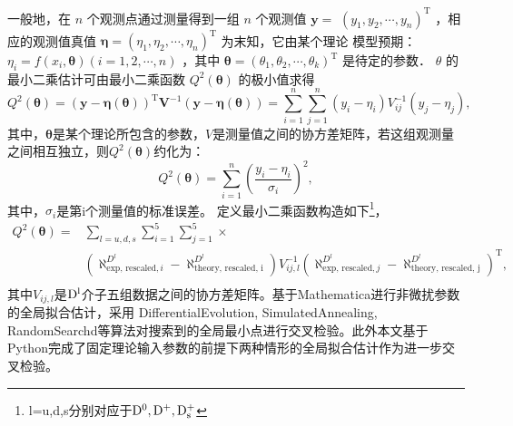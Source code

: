 一般地，在 $n$ 个观测点通过测量得到一组 $n$ 个观测值 $\boldsymbol{y}=$ $\left(y_1, y_2, \cdots, y_n\right)^{\mathrm{T}}$ ，相应的观测值真值 $\boldsymbol{\eta}=\left(\eta_1, \eta_2, \cdots, \eta_n\right)^{\mathrm{T}}$ 为末知，它由某个理论
模型预期：$\eta_i=f\left(x_i, \boldsymbol{\theta}\right)(i=1,2, \cdots, n)$ ，其中 $\boldsymbol{\theta}=\left(\theta_1, \theta_2, \cdots, \theta_k\right)^{\mathrm{T}}$ 是待定的参数． $\theta$ 的最小二乘估计可由最小二乘函数 $Q^2(\boldsymbol{\theta})$ 的极小值求得
\begin{equation}
    Q^2(\boldsymbol{\theta})=(\boldsymbol{y}-\boldsymbol{\eta}(\boldsymbol{\theta}))^{\mathrm{T}} \boldsymbol{V}^{-1}(\boldsymbol{y}-\boldsymbol{\eta}(\boldsymbol{\theta}))=\sum_{i=1}^n \sum_{j=1}^n\left(y_i-\eta_i\right) V_{i j}^{-1}\left(y_j-\eta_j\right),
    \end{equation}
其中，$\boldsymbol{\theta}$是某个理论所包含的参数，$V$是测量值之间的协方差矩阵，若这组观测量之间相互独立，则$ Q^2(\boldsymbol{\theta})$约化为：$$
Q^2(\boldsymbol{\theta})=\sum_{i=1}^n\left(\frac{y_i-\eta_i}{\sigma_i}\right)^2,
$$
其中，$\sigma_{i}$是第i个测量值的标准误差。
定义最小二乘函数构造如下\footnote{l=u,d,s分别对应于$\mathrm{D^{0}}, \mathrm{D^{+}},\mathrm{D_s^+}$}，
\begin{equation}
    \begin{aligned}
        Q^2(\boldsymbol{\theta})=&\sum_{l=u,d,s}\sum_{i=1}^{5}\sum_{j=1}^{5}\times\\
        &(\aleph_{\text{exp, rescaled}, i}^{D^l}-\aleph_{\text{theory, rescaled, i}}^{D^l})V_{i j,l}^{-1}(\aleph_{\text{exp, rescaled} ,j}^{D^l}-\aleph_{\text{theory, rescaled, j}}^{D^l})^{\text{T}},\\
    \end{aligned}
    \label{eq:chi2_func}
\end{equation}
其中$V_{ij,l}$是$\mathrm{D^{l}}$介子五组数据之间的协方差矩阵。基于Mathematica进行非微扰参数的全局拟合估计，采用 DifferentialEvolution, SimulatedAnnealing, RandomSearchd等算法对搜索到的全局最小点进行交叉检验。此外本文基于Python完成了固定理论输入参数的前提下两种情形的全局拟合估计作为进一步交叉检验。
